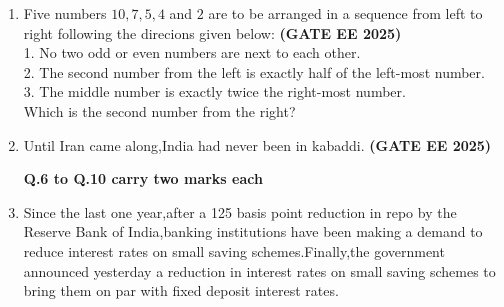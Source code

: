 \documentclass[journal,12pt,onecolumn]{IEEEtran}
\theoremstyle{remark}
\begin{document}
\begin{enumerate}
\begin{enumerate}
\end{enumerate}
\item Five numbers $10,7,5,4 $ and $2$ are to be arranged in a sequence from left to right following the direcions given below: \hfill \textbf{(GATE EE 2025)}\\
1. No two odd or even numbers are next to each other.\\
2. The second number from the left is exactly half of the left-most number.\\
3. The middle number is exactly twice the right-most number.\\
Which is the second number from the right?
\begin{enumerate}
\end{enumerate}
\item Until Iran came along,India had never been \underline{\makebox[2cm]{\hfill}} in kabaddi. \hfill \textbf{(GATE EE 2025)}
\begin{enumerate}
\end{enumerate}
\textbf{Q.6 to Q.10 carry two marks each}
\item Since the last one year,after a 125 basis point reduction in repo by the Reserve Bank of India,banking institutions have been making a demand to reduce interest rates on small saving schemes.Finally,the government announced yesterday a reduction in interest rates on small saving schemes to bring them on par with fixed deposit interest rates.\\

\end{enumerate}
\end{document}

